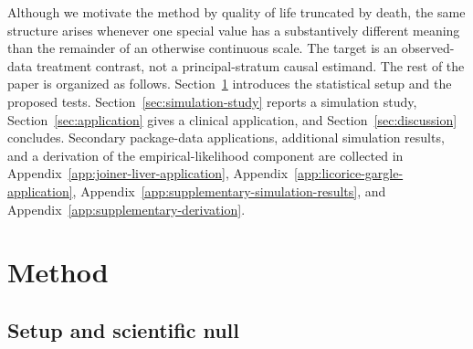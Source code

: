 \documentclass[11pt]{article}
\begin{document}
Although we motivate the method by quality of life truncated by death, the same structure arises whenever one special value has a substantively different meaning than the remainder of an otherwise continuous scale. The target is an observed-data treatment contrast, not a principal-stratum causal estimand. The rest of the paper is organized as follows. Section~\ref{sec:method} introduces the statistical setup and the proposed tests. Section~\ref{sec:simulation-study} reports a simulation study, Section~\ref{sec:application} gives a clinical application, and Section~\ref{sec:discussion} concludes. Secondary package-data applications, additional simulation results, and a derivation of the empirical-likelihood component are collected in Appendix~\ref{app:joiner-liver-application}, Appendix~\ref{app:licorice-gargle-application}, Appendix~\ref{app:supplementary-simulation-results}, and Appendix~\ref{app:supplementary-derivation}.

\section{Method}\label{sec:method}

\subsection{Setup and scientific null}
\end{document}
